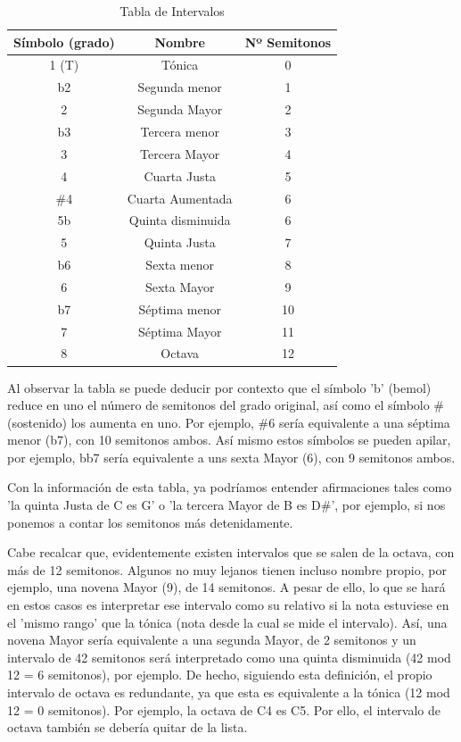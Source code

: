 \begin{table}[h]
    \centering
    \begin{tabular}{c|c|c}
        \textbf{Símbolo (grado)} & \textbf{Nombre} & \textbf{Nº Semitonos} \\
        \hline
        1 (T) & Tónica & 0 \\
        b2 & Segunda menor & 1 \\
        2 & Segunda Mayor & 2 \\
        b3 & Tercera menor & 3 \\
        3 & Tercera Mayor & 4 \\
        4 & Cuarta Justa & 5 \\
        \#4 & Cuarta Aumentada & 6 \\
        5b & Quinta disminuida & 6 \\
        5 & Quinta Justa & 7 \\
        b6 & Sexta menor & 8 \\
        6 & Sexta Mayor & 9 \\
        b7 & Séptima menor & 10 \\
        7 & Séptima Mayor & 11 \\
        8 & Octava & 12 \\
    \end{tabular}
    \caption{Tabla de Intervalos}
    \label{tab:tabla_intervalos}
\end{table}

    Al observar la tabla se puede deducir por contexto que el símbolo 'b' (bemol) reduce en uno el número de semitonos del grado original, así como el símbolo 
    \# (sostenido) los aumenta en uno. Por ejemplo, \#6 sería equivalente a una séptima menor (b7), con 10 semitonos ambos. Así mismo estos símbolos se pueden apilar, por ejemplo, bb7 sería equivalente a uns sexta Mayor (6), con 9 semitonos ambos.

    Con la información de esta tabla, ya podríamos entender afirmaciones tales como 'la quinta Justa de C es G' o 'la tercera Mayor de B es D\#', por ejemplo, si nos ponemos a contar los semitonos más detenidamente.

    Cabe recalcar que, evidentemente existen intervalos que se salen de la octava, con más de 12 semitonos. Algunos no muy lejanos tienen incluso nombre propio, por ejemplo, una novena Mayor (9), de 14 semitonos. A pesar de ello, lo que se hará en estos casos es interpretar ese intervalo como su relativo si la nota estuviese en el 'mismo rango' que la tónica (nota desde la cual se mide el intervalo). Así, una novena Mayor sería equivalente a una segunda Mayor, de 2 semitonos y un intervalo de 42 semitonos será interpretado como una quinta disminuida (42 mod 12 = 6 semitonos), por ejemplo. De hecho, siguiendo esta definición, el propio intervalo de octava es redundante, ya que esta es equivalente a la tónica (12 mod 12 = 0 semitonos). Por ejemplo, la octava de C4 es C5. Por ello, el intervalo de octava también se debería quitar de la lista.


